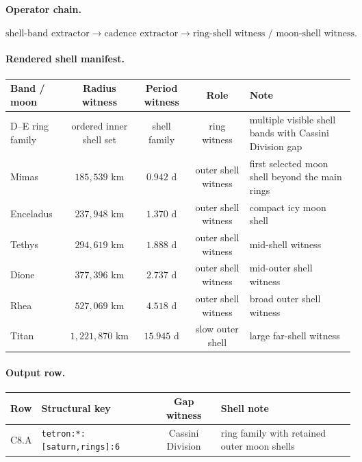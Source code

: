 \paragraph{Operator chain.}
\[
\text{shell-band extractor}
\to
\text{cadence extractor}
\to
\text{ring-shell witness / moon-shell witness}.
\]

\paragraph{Rendered shell manifest.}
\begin{center}
\footnotesize
\begin{tabularx}{\linewidth}{@{}lcccX@{}}
\toprule
Band / moon & Radius witness & Period witness & Role & Note \\
\midrule
D--E ring family & ordered inner shell set & shell family & ring witness & multiple visible shell bands with Cassini Division gap \\
Mimas & $185{,}539$ km & $0.942$ d & outer shell witness & first selected moon shell beyond the main rings \\
Enceladus & $237{,}948$ km & $1.370$ d & outer shell witness & compact icy moon shell \\
Tethys & $294{,}619$ km & $1.888$ d & outer shell witness & mid-shell witness \\
Dione & $377{,}396$ km & $2.737$ d & outer shell witness & mid-outer shell witness \\
Rhea & $527{,}069$ km & $4.518$ d & outer shell witness & broad outer shell witness \\
Titan & $1{,}221{,}870$ km & $15.945$ d & slow outer shell & large far-shell witness \\
\bottomrule
\end{tabularx}
\end{center}

\paragraph{Output row.}
\begin{center}
\begin{tabularx}{\linewidth}{@{}lXcX@{}}
\toprule
Row & Structural key & Gap witness & Shell note \\
\midrule
C8.A & \texttt{tetron:*:[saturn,rings]:6} & Cassini Division & ring family with retained outer moon shells \\
\bottomrule
\end{tabularx}
\end{center}

